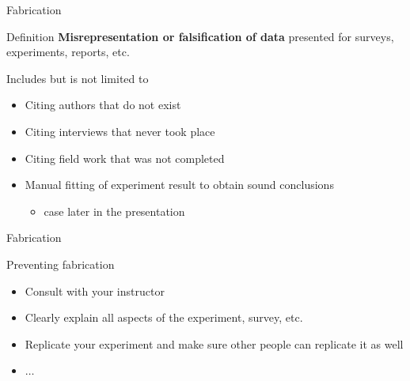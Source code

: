 	\begin{frame}{Fabrication}
		
		\begin{block}{Definition}
			\textbf{Misrepresentation or falsification of data} presented for surveys, experiments, reports, etc.

			Includes but is not limited to

			\begin{itemize}
				\item
					Citing authors that do not exist
				\item 
					Citing interviews that never took place
				\item
					Citing field work that was not completed
				\item 
					Manual fitting of experiment result to obtain sound conclusions
					\begin{itemize}
						\item 
							case later in the presentation
					\end{itemize}
			\end{itemize}

		\end{block}

	\end{frame}

	\begin{frame}{Fabrication}
		
		Preventing fabrication

		\begin{itemize}
			\item 
				Consult with your instructor
			\item 
				Clearly explain all aspects of the experiment, survey, etc.
			\item 
				Replicate your experiment and make sure other people can replicate it as well
			\item 
				$\ldots$
		\end{itemize}

	\end{frame}



